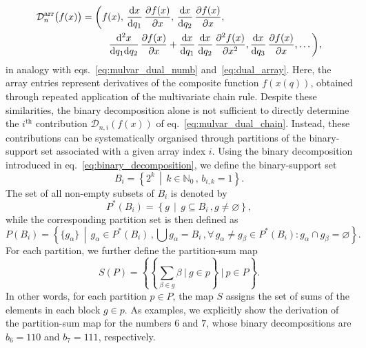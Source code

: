 \begin{align}
    {\cal D}_n^{\rm arr}\big(f(x)\big) & = 
    \bigg(
        f(x),\,
        \frac{\mathrm{d} x}{\mathrm{d} q_1}\,\frac{\partial f(x)}{\partial x},\,
        \frac{\mathrm{d} x}{\mathrm{d} q_2}\,\frac{\partial f(x)}{\partial x},\,\nonumber\\ & \phantom{=\bigg(}\quad
        \frac{\mathrm{d}^2 x}{\mathrm{d} q_1\mathrm{d} q_2}\,\frac{\partial f(x)}{\partial x} + \frac{\mathrm{d} x}{\mathrm{d} q_1}\,\frac{\mathrm{d} x}{\mathrm{d} q_2}\,\frac{\partial^2 f(x)}{\partial x^2},
        \frac{\mathrm{d} x}{\mathrm{d} q_3}\,\frac{\partial f(x)}{\partial x},
        \dots
    \bigg),
\label{eq:dual_chain_array}
\end{align}
in analogy with eqs.~\eqref{eq:mulvar_dual_numb} and~\eqref{eq:dual_array}. Here, the array entries represent derivatives of the composite function $f(x(q))$, obtained through repeated application of the multivariate chain rule. Despite these similarities, the binary decomposition alone is not sufficient to directly determine the $i^{\mathrm{th}}$ contribution $\mathcal{D}_{n,i}(f(x))$ of eq.~\eqref{eq:mulvar_dual_chain}. Instead, these contributions can be systematically organised through partitions of the binary-support set associated with a given array index $i$.
Using the binary decomposition introduced in eq.~\eqref{eq:binary_decomposition}, we define the binary-support set
\begin{equation}
    B_i = \left\{2^k \,\middle|\, k \in {\mathbb N}_0\,,\, b_{i,k}=1 \right\}.
\end{equation}
The set of all non-empty subsets of $B_i$ is denoted by
\begin{equation}
    P^\ast\!(B_i) = \left\{ g \,\middle|\, g \subseteq B_i\,, g \neq \varnothing \right\},
\end{equation}
while the corresponding partition set is then defined as
\begin{equation}
    P(B_i) = \left\{ \{g_\alpha\} \,\middle|\, g_\alpha \in P^\ast\!(B_i)\,, \bigcup g_\alpha = B_i\,, \forall\,g_\alpha\neq g_\beta \in P^\ast\!(B_i): g_\alpha\cap g_\beta=\varnothing \right\}.
\end{equation}
For each partition, we further define the partition-sum map
\begin{equation}
    S(P) = \left\{ \left\{ \sum_{\beta\in g}\beta ~\bigg\vert~ g\in p
    \right\}~\Bigg\vert~ p\in P\right\}.
\end{equation}
In other words, for each partition $p\in P$, the map $S$ assigns the set of sums of the elements in each block $g\in p$.
As examples, we explicitly show the derivation of the partition-sum map for the numbers $6$ and $7$, whose binary decompositions are $b_6 = 110$ and $b_7 = 111$, respectively.
